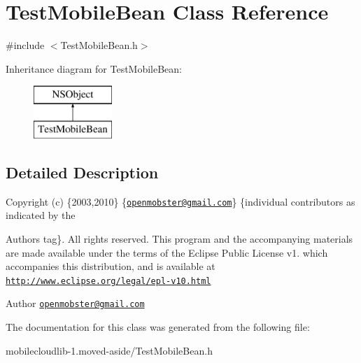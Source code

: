 \hypertarget{interface_test_mobile_bean}{
\section{\-Test\-Mobile\-Bean \-Class \-Reference}
\label{interface_test_mobile_bean}
}


{\ttfamily \#include $<$\-Test\-Mobile\-Bean.\-h$>$}

\-Inheritance diagram for \-Test\-Mobile\-Bean\-:\begin{figure}[H]
\begin{center}
\leavevmode
\includegraphics[height=2.000000cm]{interface_test_mobile_bean}
\end{center}
\end{figure}


\subsection{\-Detailed \-Description}
\-Copyright (c) \{2003,2010\} \{\href{mailto:openmobster@gmail.com}{\tt openmobster@gmail.\-com}\} \{individual contributors as indicated by the \begin{DoxyAuthor}{\-Authors}
tag\}. \-All rights reserved. \-This program and the accompanying materials are made available under the terms of the \-Eclipse \-Public \-License v1. which accompanies this distribution, and is available at \href{http://www.eclipse.org/legal/epl-v10.html}{\tt http\-://www.\-eclipse.\-org/legal/epl-\/v10.\-html}
\end{DoxyAuthor}
\begin{DoxyAuthor}{\-Author}
\href{mailto:openmobster@gmail.com}{\tt openmobster@gmail.\-com} 
\end{DoxyAuthor}


\-The documentation for this class was generated from the following file\-:\begin{DoxyCompactItemize}
\item 
mobilecloudlib-\/1.\-moved-\/aside/\-Test\-Mobile\-Bean.\-h\end{DoxyCompactItemize}
